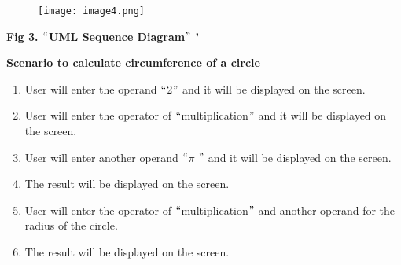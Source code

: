 \documentclass[12pt]{article}
\begin{document}
\vspace{\baselineskip}

\vspace{\baselineskip}

\vspace{\baselineskip}

\vspace{\baselineskip}

\vspace{\baselineskip}



\begin{figure}[H]
	\begin{Center}
		\texttt{[image: image4.png]}
	\end{Center}
\end{figure}



\par

\begin{Center}
\textbf{Fig 3. $``$UML Sequence Diagram$"$ ’}
\end{Center}\par


\vspace{\baselineskip}
\begin{justify}
\textbf{Scenario to calculate circumference of a circle}
\end{justify}\par

\begin{enumerate}
	\item User will enter the operand $``$2$"$  and it will be displayed on the screen.\par

	\item User will enter the operator of $``$multiplication$"$  and it will be displayed on the screen.\par

	\item User will enter another operand $``$$ \pi $ $"$  and it will be displayed on the screen.\par

	\item The result will be displayed on the screen.\par

	\item User will enter the operator of $``$multiplication$"$  and another operand for the radius of the circle.\par

	\item The result will be displayed on the screen.
\end{enumerate}\par
\end{document}
